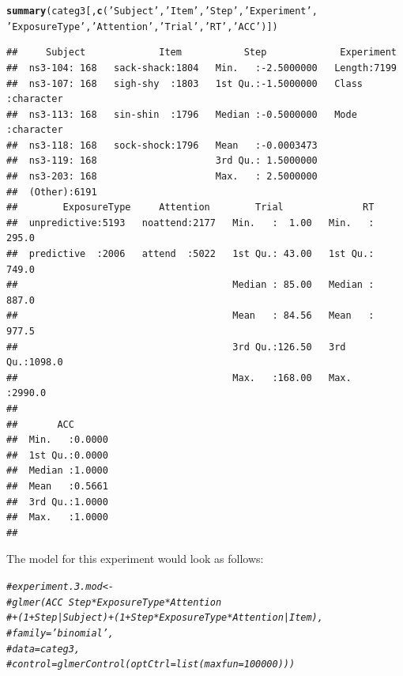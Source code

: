 \documentclass[11pt]{article}\usepackage[]{graphicx}\usepackage[]{color}
\makeatletter
\newcommand{\hlstr}[1]{\textcolor[rgb]{0.192,0.494,0.8}{#1}}%
\newcommand{\hlcom}[1]{\textcolor[rgb]{0.678,0.584,0.686}{\textit{#1}}}%
\newcommand{\hlstd}[1]{\textcolor[rgb]{0.345,0.345,0.345}{#1}}%
\newcommand{\hlkwd}[1]{\textcolor[rgb]{0.737,0.353,0.396}{\textbf{#1}}}%
\newenvironment{kframe}{%
 \def\at@end@of@kframe{}%
 \ifinner\ifhmode%
  \def\at@end@of@kframe{\end{minipage}}%
  \begin{minipage}{\columnwidth}%
 \fi\fi%
 \def\FrameCommand##1{\hskip\@totalleftmargin \hskip-\fboxsep
 \colorbox{shadecolor}{##1}\hskip-\fboxsep
     \hskip-\linewidth \hskip-\@totalleftmargin \hskip\columnwidth}%
 \MakeFramed {\advance\hsize-\width
   \@totalleftmargin\z@ \linewidth\hsize
   \@setminipage}}%
 {\par\unskip\endMakeFramed%
 \at@end@of@kframe}
\newenvironment{knitrout}{}{} %
\makeatother
\begin{document}
\begin{knitrout}\footnotesize
{}\color{fgcolor}\begin{kframe}
\begin{alltt}
 \hlkwd{summary}\hlstd{(categ3[,}\hlkwd{c}\hlstd{(}\hlstr{'Subject'}\hlstd{,} \hlstr{'Item'}\hlstd{,} \hlstr{'Step'}\hlstd{,} \hlstr{'Experiment'}\hlstd{,}
 \hlstr{'ExposureType'}\hlstd{,} \hlstr{'Attention'}\hlstd{,} \hlstr{'Trial'}\hlstd{,} \hlstr{'RT'}\hlstd{,} \hlstr{'ACC'}\hlstd{)])}
\end{alltt}
\begin{verbatim}
##     Subject             Item           Step             Experiment       
##  ns3-104: 168   sack-shack:1804   Min.   :-2.5000000   Length:7199       
##  ns3-107: 168   sigh-shy  :1803   1st Qu.:-1.5000000   Class :character  
##  ns3-113: 168   sin-shin  :1796   Median :-0.5000000   Mode  :character  
##  ns3-118: 168   sock-shock:1796   Mean   :-0.0003473                     
##  ns3-119: 168                     3rd Qu.: 1.5000000                     
##  ns3-203: 168                     Max.   : 2.5000000                     
##  (Other):6191                                                            
##        ExposureType     Attention        Trial              RT        
##  unpredictive:5193   noattend:2177   Min.   :  1.00   Min.   : 295.0  
##  predictive  :2006   attend  :5022   1st Qu.: 43.00   1st Qu.: 749.0  
##                                      Median : 85.00   Median : 887.0  
##                                      Mean   : 84.56   Mean   : 977.5  
##                                      3rd Qu.:126.50   3rd Qu.:1098.0  
##                                      Max.   :168.00   Max.   :2990.0  
##                                                                       
##       ACC        
##  Min.   :0.0000  
##  1st Qu.:0.0000  
##  Median :1.0000  
##  Mean   :0.5661  
##  3rd Qu.:1.0000  
##  Max.   :1.0000  
## 
\end{verbatim}
\end{kframe}
\end{knitrout}

The model for this experiment would look as follows:

\begin{knitrout}\footnotesize
{}\color{fgcolor}\begin{kframe}
\begin{alltt}
 \hlcom{#experiment.3.mod <-}
 \hlcom{#glmer(ACC ~ Step*ExposureType*Attention}
 \hlcom{#+ (1+Step|Subject) + (1+Step*ExposureType*Attention|Item),}
 \hlcom{#family='binomial',}
 \hlcom{#data=categ3,}
 \hlcom{#control = glmerControl(optCtrl = list(maxfun = 100000) ))}
\end{alltt}
\end{kframe}
\end{knitrout}
\end{document}
